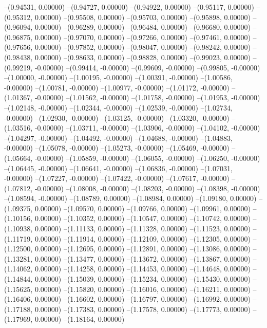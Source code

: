 --(0.94531, 0.00000)
--(0.94727, 0.00000)
--(0.94922, 0.00000)
--(0.95117, 0.00000)
--(0.95312, 0.00000)
--(0.95508, 0.00000)
--(0.95703, 0.00000)
--(0.95898, 0.00000)
--(0.96094, 0.00000)
--(0.96289, 0.00000)
--(0.96484, 0.00000)
--(0.96680, 0.00000)
--(0.96875, 0.00000)
--(0.97070, 0.00000)
--(0.97266, 0.00000)
--(0.97461, 0.00000)
--(0.97656, 0.00000)
--(0.97852, 0.00000)
--(0.98047, 0.00000)
--(0.98242, 0.00000)
--(0.98438, 0.00000)
--(0.98633, 0.00000)
--(0.98828, 0.00000)
--(0.99023, 0.00000)
--(0.99219, -0.00000)
--(0.99414, -0.00000)
--(0.99609, -0.00000)
--(0.99805, -0.00000)
--(1.00000, -0.00000)
--(1.00195, -0.00000)
--(1.00391, -0.00000)
--(1.00586, -0.00000)
--(1.00781, -0.00000)
--(1.00977, -0.00000)
--(1.01172, -0.00000)
--(1.01367, -0.00000)
--(1.01562, -0.00000)
--(1.01758, -0.00000)
--(1.01953, -0.00000)
--(1.02148, -0.00000)
--(1.02344, -0.00000)
--(1.02539, -0.00000)
--(1.02734, -0.00000)
--(1.02930, -0.00000)
--(1.03125, -0.00000)
--(1.03320, -0.00000)
--(1.03516, -0.00000)
--(1.03711, -0.00000)
--(1.03906, -0.00000)
--(1.04102, -0.00000)
--(1.04297, -0.00000)
--(1.04492, -0.00000)
--(1.04688, -0.00000)
--(1.04883, -0.00000)
--(1.05078, -0.00000)
--(1.05273, -0.00000)
--(1.05469, -0.00000)
--(1.05664, -0.00000)
--(1.05859, -0.00000)
--(1.06055, -0.00000)
--(1.06250, -0.00000)
--(1.06445, -0.00000)
--(1.06641, -0.00000)
--(1.06836, -0.00000)
--(1.07031, -0.00000)
--(1.07227, -0.00000)
--(1.07422, -0.00000)
--(1.07617, -0.00000)
--(1.07812, -0.00000)
--(1.08008, -0.00000)
--(1.08203, -0.00000)
--(1.08398, -0.00000)
--(1.08594, -0.00000)
--(1.08789, 0.00000)
--(1.08984, 0.00000)
--(1.09180, 0.00000)
--(1.09375, 0.00000)
--(1.09570, 0.00000)
--(1.09766, 0.00000)
--(1.09961, 0.00000)
--(1.10156, 0.00000)
--(1.10352, 0.00000)
--(1.10547, 0.00000)
--(1.10742, 0.00000)
--(1.10938, 0.00000)
--(1.11133, 0.00000)
--(1.11328, 0.00000)
--(1.11523, 0.00000)
--(1.11719, 0.00000)
--(1.11914, 0.00000)
--(1.12109, 0.00000)
--(1.12305, 0.00000)
--(1.12500, 0.00000)
--(1.12695, 0.00000)
--(1.12891, 0.00000)
--(1.13086, 0.00000)
--(1.13281, 0.00000)
--(1.13477, 0.00000)
--(1.13672, 0.00000)
--(1.13867, 0.00000)
--(1.14062, 0.00000)
--(1.14258, 0.00000)
--(1.14453, 0.00000)
--(1.14648, 0.00000)
--(1.14844, 0.00000)
--(1.15039, 0.00000)
--(1.15234, 0.00000)
--(1.15430, 0.00000)
--(1.15625, 0.00000)
--(1.15820, 0.00000)
--(1.16016, 0.00000)
--(1.16211, 0.00000)
--(1.16406, 0.00000)
--(1.16602, 0.00000)
--(1.16797, 0.00000)
--(1.16992, 0.00000)
--(1.17188, 0.00000)
--(1.17383, 0.00000)
--(1.17578, 0.00000)
--(1.17773, 0.00000)
--(1.17969, 0.00000)
--(1.18164, 0.00000)
